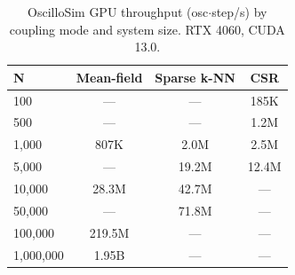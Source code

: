 \begin{table}[t]
\centering
\caption{OscilloSim GPU throughput (osc$\cdot$step/s) by coupling mode and system size. RTX 4060, CUDA 13.0.}
\label{tab:oscillosim}
\begin{tabular}{lccc}
\toprule
N & Mean-field & Sparse k-NN & CSR \\
\midrule
100 & --- & --- & 185K \\
500 & --- & --- & 1.2M \\
1,000 & 807K & 2.0M & 2.5M \\
5,000 & --- & 19.2M & 12.4M \\
10,000 & 28.3M & 42.7M & --- \\
50,000 & --- & 71.8M & --- \\
100,000 & 219.5M & --- & --- \\
1,000,000 & 1.95B & --- & --- \\
\bottomrule
\end{tabular}
\end{table}